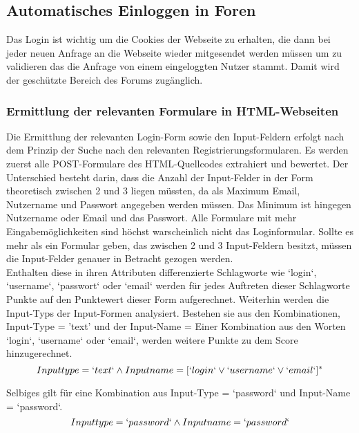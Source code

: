 
\subsection {Automatisches Einloggen in Foren}
Das Login ist wichtig um die Cookies der Webseite zu erhalten, die dann bei jeder neuen Anfrage an die Webseite wieder mitgesendet werden müssen um zu validieren das die Anfrage von einem eingeloggten Nutzer stammt. Damit wird der geschützte Bereich des Forums zugänglich.
\subsubsection{Ermittlung der relevanten Formulare in HTML-Webseiten}
Die Ermittlung der relevanten Login-Form sowie den Input-Feldern erfolgt nach dem Prinzip der Suche nach den relevanten Registrierungsformularen. Es werden zuerst alle POST-Formulare des HTML-Quellcodes extrahiert und bewertet. Der Unterschied besteht darin, dass die Anzahl der Input-Felder in der Form theoretisch zwischen 2 und 3 liegen müssten, da als Maximum Email, Nutzername und Passwort angegeben werden müssen. Das Minimum ist hingegen Nutzername oder Email und das Passwort. Alle Formulare mit mehr Eingabemöglichkeiten sind höchst warscheinlich nicht das Loginformular.
Sollte es mehr als ein Formular geben, das zwischen 2 und 3 Input-Feldern besitzt, müssen die Input-Felder genauer in Betracht gezogen werden. \\
Enthalten diese in ihren Attributen differenzierte Schlagworte wie `login`, `username`, `passwort` oder `email` werden für jedes Auftreten dieser Schlagworte Punkte auf den Punktewert dieser Form aufgerechnet. Weiterhin werden die Input-Typs der Input-Formen analysiert. Bestehen sie aus den Kombinationen, Input-Type = 'text' und der Input-Name = Einer Kombination aus den Worten `login`, `username` oder `email`, werden weitere Punkte zu dem Score hinzugerechnet.
\[Inputtype = `text` \wedge Inputname = [`login` \vee `username` \vee `email`]^*\]

 Selbiges gilt für eine Kombination aus Input-Type = `password` und Input-Name = `password`.
 \[Inputtype = `password` \wedge Inputname = `password`\]
 
